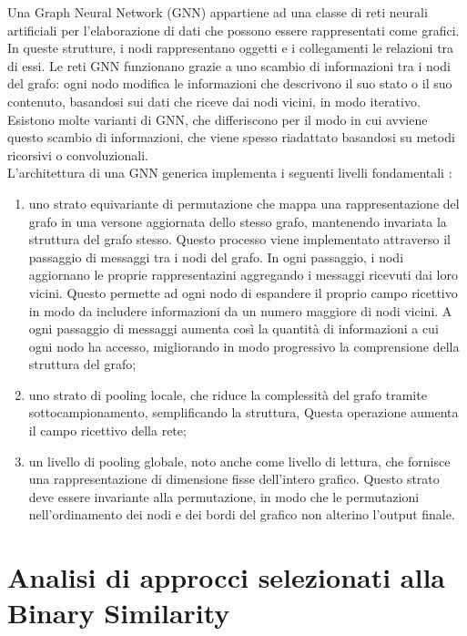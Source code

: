 \documentclass[12pt,a4paper,openright,twoside]{report}
\begin{document}
Una Graph Neural Network (GNN) \cite{gnn} appartiene ad una classe di reti neurali artificiali per l'elaborazione di dati che possono essere rappresentati come grafici. In queste strutture, i nodi rappresentano oggetti e i collegamenti le relazioni tra di essi. Le reti GNN funzionano grazie a uno scambio di informazioni tra i nodi del grafo: ogni nodo modifica le informazioni che descrivono il suo stato o il suo contenuto, basandosi sui dati che riceve dai nodi vicini, in modo iterativo. Esistono molte varianti di GNN, che differiscono per il modo in cui avviene questo scambio di informazioni, che viene spesso riadattato basandosi su metodi ricorsivi o convoluzionali.\\
L'architettura di una GNN generica implementa i seguenti livelli fondamentali \cite{gilmer2017mpnn} \cite{wu2021gnn}:
\begin{enumerate}
    \item uno strato equivariante di permutazione che mappa una rappresentazione del grafo in una versone aggiornata dello stesso grafo, mantenendo invariata la struttura del grafo stesso. Questo processo viene implementato attraverso il passaggio di messaggi tra i nodi del grafo. In ogni passaggio, i nodi aggiornano le proprie rappresentazini aggregando i messaggi ricevuti dai loro vicini. Questo permette ad ogni nodo di espandere il proprio campo ricettivo in modo da includere informazioni da un numero maggiore di nodi vicini. A ogni passaggio di messaggi aumenta così la quantità di informazioni a cui ogni nodo ha accesso, migliorando in modo progressivo la comprensione della struttura del grafo;
    \item uno strato di pooling locale, che riduce la complessità del grafo tramite sottocampionamento, semplificando la struttura, Questa operazione aumenta il campo ricettivo della rete;
    \item un livello di pooling globale, noto anche come livello di lettura, che fornisce una rappresentazione di dimensione fisse dell'intero grafico. Questo strato deve essere invariante alla permutazione, in modo che le permutazioni nell'ordinamento dei nodi e dei bordi del grafico non alterino l'output finale.
\end{enumerate}


\clearpage{\pagestyle{empty}\cleardoublepage}

\chapter{Analisi di approcci selezionati alla Binary Similarity}\label{Cap3}
\end{document}
